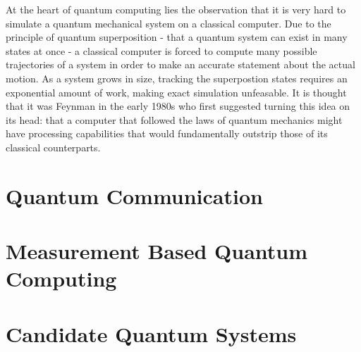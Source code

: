 At the heart of quantum computing lies the observation that it is very hard to simulate a quantum mechanical system on a classical computer. Due to the principle of quantum superposition - that a quantum system can exist in many states at once - a classical computer is forced to compute many possible trajectories of a system in order to make an accurate statement about the actual motion. As a system grows in size, tracking the superpostion states requires an exponential amount of work, making exact simulation unfeasable. It is thought that it was Feynman in the early 1980s \cite{feynman82} who first suggested turning this idea on its head: that a computer that followed the laws of quantum mechanics might have processing capabilities that would fundamentally outstrip those of its classical counterparts. 



\section{Quantum Communication}

\section{Measurement Based Quantum Computing}

\section{Candidate Quantum Systems}


